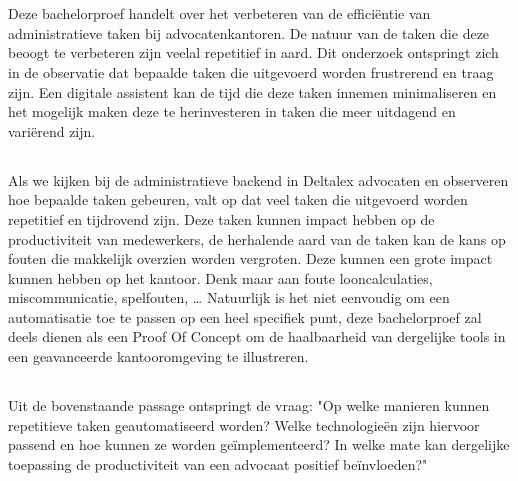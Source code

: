 
\chapter{}%
Deze bachelorproef handelt over het verbeteren van de efficiëntie van administratieve taken bij advocatenkantoren.
De natuur van de taken die deze beoogt te verbeteren zijn veelal repetitief in aard.
Dit onderzoek ontspringt zich in de observatie dat bepaalde taken die uitgevoerd worden frustrerend en traag zijn.
Een digitale assistent kan de tijd die deze taken innemen minimaliseren en het mogelijk maken deze te herinvesteren in taken die meer uitdagend en variërend zijn.

\section{}%
\label{sec:probleemstelling}

Als we kijken bij de administratieve backend in Deltalex advocaten en observeren hoe bepaalde taken gebeuren, valt op dat veel taken die uitgevoerd worden repetitief en tijdrovend zijn.
Deze taken kunnen impact hebben op de productiviteit van medewerkers, de herhalende aard van de taken kan de kans op fouten die makkelijk overzien worden vergroten.
Deze kunnen een grote impact kunnen hebben op het kantoor.
Denk maar aan foute looncalculaties, miscommunicatie, spelfouten, \dots
Natuurlijk is het niet eenvoudig om een automatisatie toe te passen op een heel specifiek punt, deze bachelorproef zal deels dienen als een Proof Of Concept om de haalbaarheid van
dergelijke tools in een geavanceerde kantooromgeving te illustreren.

\section{}%
\label{sec:onderzoeksvraag}

Uit de bovenstaande passage ontspringt de vraag:
"Op welke manieren kunnen repetitieve taken geautomatiseerd worden?
Welke technologieën zijn hiervoor passend en hoe kunnen ze worden geïmplementeerd?
In welke mate kan dergelijke toepassing de productiviteit van een advocaat positief beïnvloeden?"

